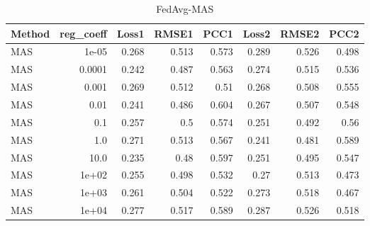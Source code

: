\begin{table}
\caption{FedAvg-MAS}
\begin{tabular}{lrrrrrrr}
\toprule
Method & reg_coeff & Loss1 & RMSE1 & PCC1 & Loss2 & RMSE2 & PCC2 \\
\midrule
MAS & 1e-05 & 0.268 & 0.513 & 0.573 & 0.289 & 0.526 & 0.498 \\
MAS & 0.0001 & 0.242 & 0.487 & 0.563 & 0.274 & 0.515 & 0.536 \\
MAS & 0.001 & 0.269 & 0.512 & 0.51 & 0.268 & 0.508 & 0.555 \\
MAS & 0.01 & 0.241 & 0.486 & 0.604 & 0.267 & 0.507 & 0.548 \\
MAS & 0.1 & 0.257 & 0.5 & 0.574 & 0.251 & 0.492 & 0.56 \\
MAS & 1.0 & 0.271 & 0.513 & 0.567 & 0.241 & 0.481 & 0.589 \\
MAS & 10.0 & 0.235 & 0.48 & 0.597 & 0.251 & 0.495 & 0.547 \\
MAS & 1e+02 & 0.255 & 0.498 & 0.532 & 0.27 & 0.513 & 0.473 \\
MAS & 1e+03 & 0.261 & 0.504 & 0.522 & 0.273 & 0.518 & 0.467 \\
MAS & 1e+04 & 0.277 & 0.517 & 0.589 & 0.287 & 0.526 & 0.518 \\
\bottomrule
\end{tabular}
\end{table}
